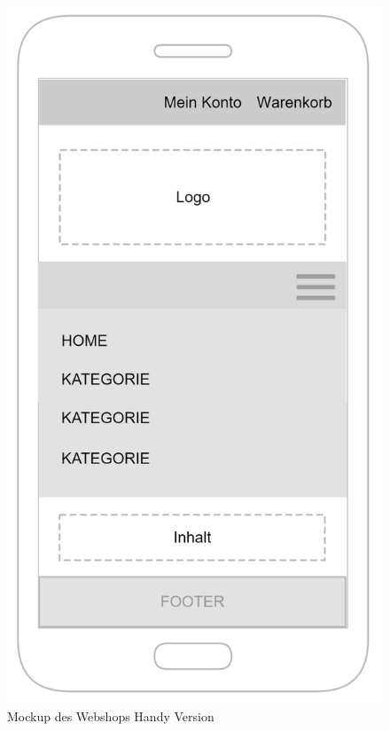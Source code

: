 \begin{figure}[ht!]
	\centering
	\includegraphics[width=0.35\linewidth]{bilder/kap6/mockup_mobile.png}
	\caption{Mockup des Webshops Handy Version}
	\label{fig:mockup_mobile}
\end{figure}

\newpage